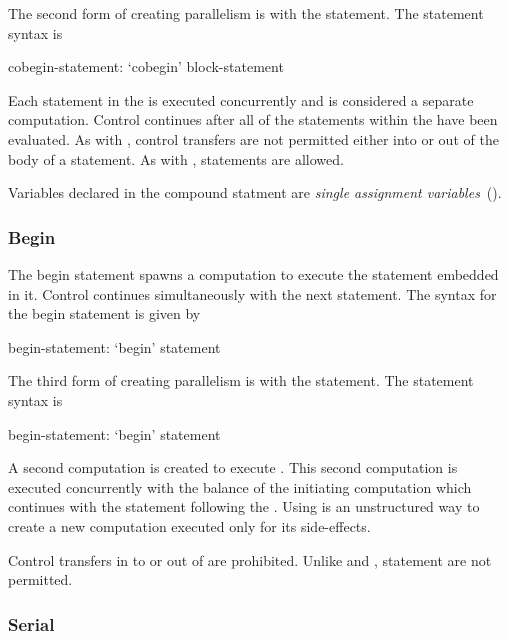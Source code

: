 The second form of creating parallelism is with the 
statement. The  statement syntax is
\begin{syntax}
cobegin-statement:
  `cobegin' block-statement
\end{syntax}
Each statement in the  is executed concurrently
and is considered a separate computation. Control continues after all
of the statements within the  have been
evaluated. As with , control transfers are not permitted
either into or out of the body of a  statement. As
with ,  statements are allowed.

Variables declared in the  compound statment are {\em single
assignment variables}~(). 

\subsubsection{Begin}
\label{Begin}

The begin statement spawns a computation to execute the statement
embedded in it.  Control continues simultaneously with the next
statement.  The syntax for the begin statement is given by
\begin{syntax}
begin-statement:
  `begin' statement
\end{syntax}

The third form of creating parallelism is with the 
statement. The  statement syntax is
\begin{syntax}
begin-statement:
  `begin' statement
\end{syntax}
A second computation is created to execute .
This second computation is executed concurrently with the balance of
the initiating computation which continues with the statement
following the . Using  is an unstructured way to 
create a new computation executed only for its side-effects.

Control transfers in to or out of  are prohibited. Unlike
 and ,  statement are not permitted.


\subsubsection{Serial}
\label{Serial}

